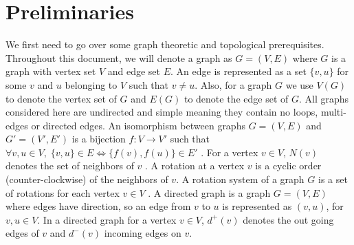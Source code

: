 \documentclass{article}
\begin{document}
\section{Preliminaries}\label{sec2}
    We first need to go over some graph theoretic and topological prerequisites.
    Throughout this document, we will denote a graph as $G = (V, E)$ where $G$ is a graph with vertex set $V$ and edge set $E$. An edge is represented as a set $\{v, u\}$ for some $v$ and $u$ belonging to $V$ such that $v \neq u$. Also, for a graph $G$ we use $V(G)$ to denote the vertex set of $G$ and $E(G)$ to denote the edge set of $G$. 
    All graphs considered here are undirected and simple meaning they contain no loops, multi-edges or directed edges. 
    An isomorphism between graphs $G = (V, E)$ and $G' = (V', E')$ is a bijection $f : V \to V'$ such that $\forall v, u \in V,\; \{v, u\} \in E \iff  \{f(v), f(u)\} \in E'$ \cite{Diestel97, West01}. For a vertex $v \in V$, $N(v)$ denotes the set of neighbors of $v$ \cite{Diestel97}. 
    A rotation at a vertex $v$ is a cyclic order (counter-clockwise) of the neighbors of $v$. A rotation system of a graph $G$ is a set of rotations for each vertex $v \in V$ \cite{Beyer16}.
    A directed graph is a graph $G  = (V, E)$ where edges have direction, so an edge from $v$ to $u$ is represented as $(v, u)$, for $v,u \in V$. In a directed graph for a vertex $v \in V$, $d^+(v)$ denotes the out going edges of $v$ and $d^-(v)$ incoming edges on $v$.
\end{document}
